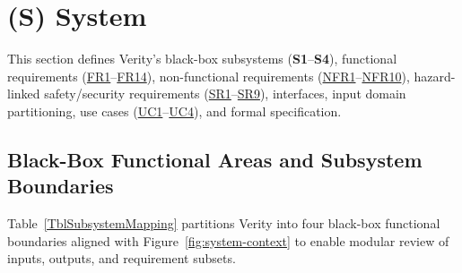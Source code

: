\documentclass[11pt]{article}
\begin{document}
\section*{(S) System}\label{sec:srs-system}
\renewcommand{\thesubsection}{S.\arabic{subsection}}
\renewcommand{\theHsubsection}{S.\arabic{subsection}}
\setcounter{subsection}{0}

This section defines Verity's black-box subsystems (\textbf{S1}--\textbf{S4}), functional requirements (\hyperref[FR1]{FR1}--\hyperref[FR14]{FR14}), non-functional requirements (\hyperref[NFR1]{NFR1}--\hyperref[NFR10]{NFR10}), hazard-linked safety/security requirements (\hyperref[SR1]{SR1}--\hyperref[SR9]{SR9}), interfaces, input domain partitioning, use cases (\hyperref[UC1]{UC1}--\hyperref[UC4]{UC4}), and formal specification.

\subsection{Black-Box Functional Areas and Subsystem Boundaries}\label{subsec:system-components}

Table~\ref{TblSubsystemMapping} partitions Verity into four black-box functional boundaries aligned with Figure~\ref{fig:system-context} to enable modular review of inputs, outputs, and requirement subsets.
\end{document}
